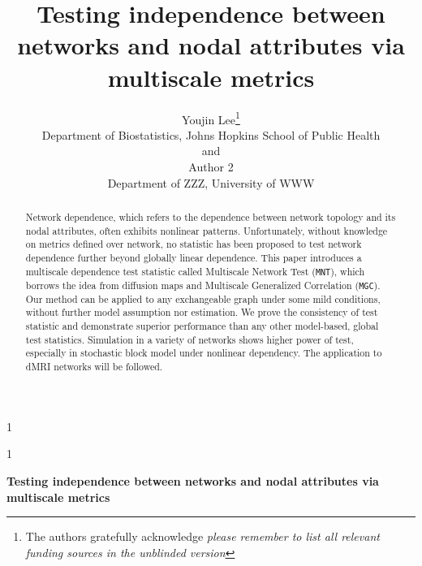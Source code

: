 \documentclass[12pt]{article}
\newcommand{\blind}{1}
\theoremstyle{definition}
\begin{document}
	
	
	\def\spacingset#1{\renewcommand{\baselinestretch}%
		{#1}\small\normalsize} \spacingset{1}
	
	
	
	\blind
	{
		\title{\bf Testing independence between networks and nodal attributes via multiscale metrics}
		\author{Youjin Lee\thanks{
				The authors gratefully acknowledge \textit{please remember to list all relevant funding sources in the unblinded version}}\hspace{.2cm}\\
			Department of Biostatistics, Johns Hopkins School of Public Health\\
			and \\
			Author 2 \\
			Department of ZZZ, University of WWW}
		\maketitle
	} \fi
	
	\blind
	{
		\bigskip
		\bigskip
		\bigskip
		\begin{center}
			{\LARGE\bf Testing independence between networks and nodal attributes via multiscale metrics}
		\end{center}
		\medskip
	} \fi
	
	
\sloppy
\bigskip
\begin{abstract}
		Network dependence, which refers to the dependence between network topology and its nodal attributes, often exhibits nonlinear patterns. Unfortunately, without knowledge on metrics defined over network, no statistic has been proposed to test network dependence further beyond globally linear dependence. This paper introduces a multiscale dependence test statistic called Multiscale Network Test (\texttt{MNT}), which borrows the idea from diffusion maps and Multiscale Generalized Correlation (\texttt{MGC}). Our method can be applied to any exchangeable graph under some mild conditions, without further model assumption nor estimation. We prove the consistency of test statistic and demonstrate superior performance than any other model-based, global test statistics. Simulation in a variety of networks shows higher power of test, especially in stochastic block model under nonlinear dependency. The application to dMRI networks will be followed. 
\end{abstract}
	
\end{document}
